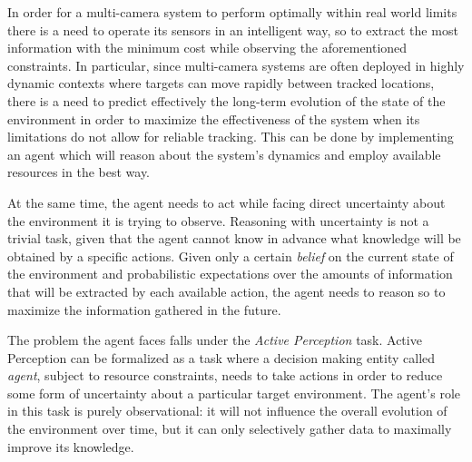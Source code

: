 
In order for a multi-camera system to perform optimally within real world limits there is a need to
operate its sensors in an intelligent way, so to extract the most information with the minimum cost
while observing the aforementioned constraints. In particular, since multi-camera systems are often
deployed in highly dynamic contexts where targets can move rapidly between tracked locations, there
is a need to predict effectively the long-term evolution of the state of the environment in order to
maximize the effectiveness of the system when its limitations do not allow for reliable tracking.
This can be done by implementing an agent which will reason about the system's dynamics and employ
available resources in the best way.

At the same time, the agent needs to act while facing direct uncertainty about the environment it is
trying to observe. Reasoning with uncertainty is not a trivial task, given that the agent cannot
know in advance what knowledge will be obtained by a specific actions. Given only a certain
\textit{belief} on the current state of the environment and probabilistic expectations over the
amounts of information that will be extracted by each available action, the agent needs to reason so
to maximize the information gathered in the future.


The problem the agent faces falls under the \textit{Active Perception} \cite{cit:relworkspaan}
\cite{cit:relworkspaancoop} \cite{cit:relworksatsangi} task.  Active Perception can be formalized as
a task where a decision making entity called \textit{agent}, subject to resource constraints, needs
to take actions in order to reduce some form of uncertainty about a particular target environment.
The agent's role in this task is purely observational: it will not influence the overall evolution
of the environment over time, but it can only selectively gather data to maximally improve its
knowledge.

